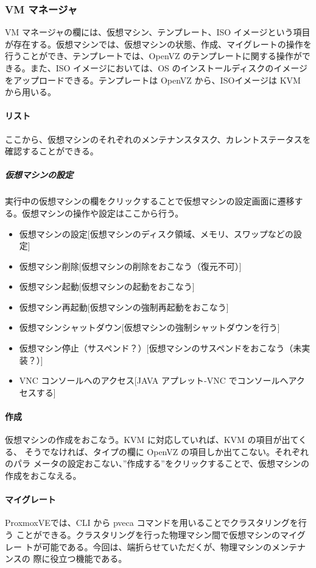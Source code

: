 \documentclass[mingoth,a4paper]{jsarticle}
\begin{document}
\subsubsection{VM マネージャ}
VM マネージャの欄には、仮想マシン、テンプレート、ISO イメージという項目
が存在する。仮想マシンでは、仮想マシンの状態、作成、マイグレートの操作を
行うことができ、テンプレートでは、OpenVZ のテンプレートに関する操作がで
きる。また、ISO イメージにおいては、OS のインストールディスクのイメージ
をアップロードできる。テンプレートは OpenVZ から、ISOイメージは KVM から用いる。

\paragraph{リスト}
ここから、仮想マシンのそれぞれのメンテナンスタスク、カレントステータスを確認することができる。

\subparagraph{仮想マシンの設定}
実行中の仮想マシンの欄をクリックすることで仮想マシンの設定画面に遷移する。仮想マシンの操作や設定はここから行う。

\begin{itemize}
 \item 仮想マシンの設定[仮想マシンのディスク領域、メモリ、スワップなどの設定]
 \item 仮想マシン削除[仮想マシンの削除をおこなう（復元不可）]
 \item 仮想マシン起動[仮想マシンの起動をおこなう]
 \item 仮想マシン再起動[仮想マシンの強制再起動をおこなう]
 \item 仮想マシンシャットダウン[仮想マシンの強制シャットダウンを行う]
 \item 仮想マシン停止（サスペンド？）[仮想マシンのサスペンドをおこなう（未実装？）]
 \item VNC コンソールへのアクセス[JAVA アプレット-VNC でコンソールへアクセスする]
\end{itemize}

\paragraph{作成}
仮想マシンの作成をおこなう。KVM に対応していれば、KVM の項目が出てくる、
そうでなければ、タイプの欄に OpenVZ の項目しか出てこない。それぞれのパラ
メータの設定おこない、”作成する”をクリックすることで、仮想マシンの作成をおこなえる。

\paragraph{マイグレート}
ProxmoxVEでは、CLI から pveca コマンドを用いることでクラスタリングを行う
ことができる。クラスタリングを行った物理マシン間で仮想マシンのマイグレー
トが可能である。今回は、端折らせていただくが、物理マシンのメンテナンスの
際に役立つ機能である。
\end{document}
